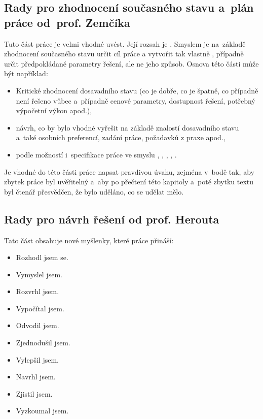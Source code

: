 \subsection*{Rady pro zhodnocení současného stavu a~plán práce od~prof. Zemčíka}

Tuto část práce je velmi vhodné uvést. Její rozsah je . Smyslem je na~základě zhodnocení současného stavu určit cíl práce a vytvořit tak vlastně , případně určit předpokládané parametry řešení, ale ne jeho způsob. Osnova této části může být například:
\begin{itemize}
  \item{Kritické zhodnocení dosavadního stavu (co je dobře, co je špatně, co případně není řešeno vůbec a~případně cenové parametry, dostupnost řešení, potřebný výpočetní výkon apod.), }
  \item{návrh, co by bylo vhodné vyřešit na základě znalostí dosavadního stavu a~také osobních preferencí, zadání práce, požadavků z praxe apod.,}
  \item{podle možností i~specifikace práce ve smyslu , , , , .}
\end{itemize}
Je vhodné do této části práce napsat pravdivou úvahu, zejména v~bodě  tak, aby zbytek práce byl uvěřitelný a~aby po přečtení této kapitoly a~poté zbytku textu byl čtenář přesvědčen, že bylo uděláno, co se udělat mělo.


\subsection*{Rady pro návrh řešení od prof. Herouta}

Tato část obsahuje nové myšlenky, které práce přináší:
\begin{itemize}
  \item{Rozhodl jsem se.}
  \item{Vymyslel jsem.}
  \item{Rozvrhl jsem.}
  \item{Vypočítal jsem.}
  \item{Odvodil jsem.}
  \item{Zjednodušil jsem.}
  \item{Vylepšil jsem.}
  \item{Navrhl jsem.}
  \item{Zjistil jsem.}
  \item{Vyzkoumal jsem.}
\end{itemize}

